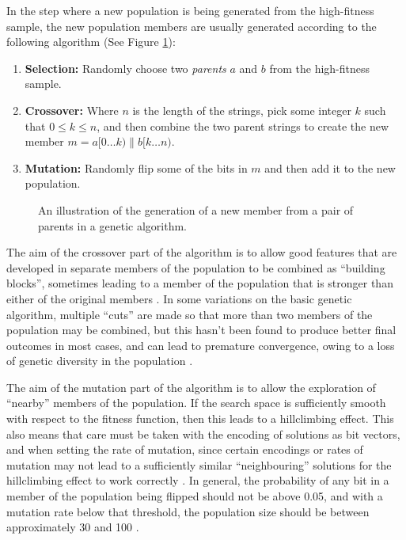 \documentclass[proof,pdftex,11pt,a4,titlepage]{article}
\begin{document}
In the step where a new population is being generated from the high-fitness sample, the new population members are usually generated according to the following algorithm (See Figure \ref{fig:genetic-algo}):

\begin{enumerate}
  \item {\bf Selection:} Randomly choose two \emph{parents} $a$ and $b$ from the high-fitness sample.
  \item {\bf Crossover:} Where $n$ is the length of the strings, pick some integer $k$ such that $0 \leq k \leq n$, and then combine the two parent strings to create the new member $m = a[0 \ldots k) \parallel b[k \ldots n)$.
  \item {\bf Mutation:} Randomly flip some of the bits in $m$ and then add it to the new population.
\end{enumerate}

\begin{figure}[h]
  
  \caption{An illustration of the generation of a new member from a pair of parents in a genetic algorithm.}
  \label{fig:genetic-algo}
\end{figure}

The aim of the crossover part of the algorithm is to allow good features that are developed in separate members of the population to be combined as ``building blocks'', sometimes leading to a member of the population that is stronger than either of the original members \cite{Goldberg:1989}. In some variations on the basic genetic algorithm, multiple ``cuts'' are made so that more than two members of the population may be combined, but this hasn't been found to produce better final outcomes in most cases, and can lead to premature convergence, owing to a loss of genetic diversity in the population \cite{Esquivel:1997}.

The aim of the mutation part of the algorithm is to allow the exploration of ``nearby'' members of the population. If the search space is sufficiently smooth with respect to the fitness function, then this leads to a hillclimbing effect. This also means that care must be taken with the encoding of solutions as bit vectors, and when setting the rate of mutation, since certain encodings or rates of mutation may not lead to a sufficiently similar ``neighbouring'' solutions for the hillclimbing effect to work correctly \cite{Taher:2013}. In general, the probability of any bit in a member of the population being flipped should not be above 0.05, and with a mutation rate below that threshold, the population size should be between approximately 30 and 100 \cite{Grefenstette:1986}.
\end{document}
